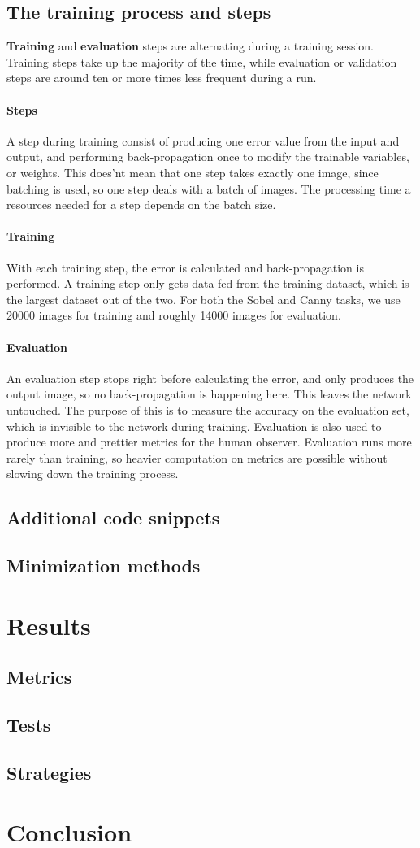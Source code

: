 \documentclass[a4paper,12pt]{article}
\begin{document}
\subsection{The training process and steps}
\textbf{Training} and \textbf{evaluation} steps are alternating during a training session. Training steps take up the majority of the time, while evaluation or validation steps are around ten or more times less frequent during a run.
\paragraph{Steps}
A step during training consist of producing one error value from the input and output, and performing back-propagation once to modify the trainable variables, or weights. This does'nt mean that one step takes exactly one image, since batching is used, so one step deals with a batch of images. The processing time a resources needed for a step depends on the batch size.
\paragraph{Training}
With each training step, the error is calculated and back-propagation is performed. A training step only gets data fed from the training dataset, which is the largest dataset out of the two. For both the Sobel and Canny tasks, we use 20000 images for training and roughly 14000 images for evaluation.
\paragraph{Evaluation}
An evaluation step stops right before calculating the error, and only produces the output image, so no back-propagation is happening here. This leaves the network untouched. The purpose of this is to measure the accuracy on the evaluation set, which is invisible to the network during training. Evaluation is also used to produce more and prettier metrics for the human observer. Evaluation runs more rarely than training, so heavier computation on metrics are possible without slowing down the training process.
\subsection{Additional code snippets}
\subsection{Minimization methods}
\newpage
\section{Results}
\subsection{Metrics}
\subsection{Tests}
\subsection{Strategies}
\newpage
\section{Conclusion}
\begin{appendix}
\listoffigures
\listoftables
\end{appendix}
\end{document}

